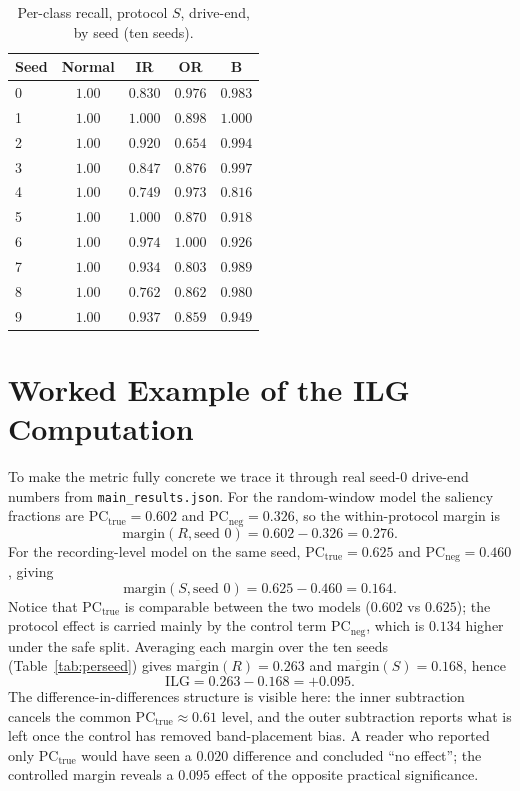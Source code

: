 \documentclass[11pt]{article}
\begin{document}
\begin{table}[H]
\centering
\caption{Per-class recall, protocol $S$, drive-end, by seed (ten seeds).}
\label{tab:perclass}
\begin{tabular}{lcccc}
\toprule
Seed & Normal & IR & OR & B \\
\midrule
0 & $1.00$ & $0.830$ & $0.976$ & $0.983$ \\
1 & $1.00$ & $1.000$ & $0.898$ & $1.000$ \\
2 & $1.00$ & $0.920$ & $0.654$ & $0.994$ \\
3 & $1.00$ & $0.847$ & $0.876$ & $0.997$ \\
4 & $1.00$ & $0.749$ & $0.973$ & $0.816$ \\
5 & $1.00$ & $1.000$ & $0.870$ & $0.918$ \\
6 & $1.00$ & $0.974$ & $1.000$ & $0.926$ \\
7 & $1.00$ & $0.934$ & $0.803$ & $0.989$ \\
8 & $1.00$ & $0.762$ & $0.862$ & $0.980$ \\
9 & $1.00$ & $0.937$ & $0.859$ & $0.949$ \\
\bottomrule
\end{tabular}
\end{table}

\section{Worked Example of the ILG Computation}
\label{app:worked}
To make the metric fully concrete we trace it through real seed-0 drive-end numbers from
\texttt{main\_results.json}. For the random-window model the saliency fractions are
$\mathrm{PC_{true}}=0.602$ and $\mathrm{PC_{neg}}=0.326$, so the within-protocol margin is
\begin{equation}
\text{margin}(R, \text{seed }0) = 0.602 - 0.326 = 0.276 .
\end{equation}
For the recording-level model on the same seed, $\mathrm{PC_{true}}=0.625$ and
$\mathrm{PC_{neg}}=0.460$, giving
\begin{equation}
\text{margin}(S, \text{seed }0) = 0.625 - 0.460 = 0.164 .
\end{equation}
Notice that $\mathrm{PC_{true}}$ is comparable between the two models
($0.602$ vs $0.625$); the protocol effect is carried mainly by the control term
$\mathrm{PC_{neg}}$, which is $0.134$ higher under the safe split. Averaging each margin
over the ten seeds (Table~\ref{tab:perseed}) gives $\overline{\text{margin}}(R)=0.263$
and $\overline{\text{margin}}(S)=0.168$, hence
\begin{equation}
\mathrm{ILG} = 0.263 - 0.168 = +0.095 .
\end{equation}
The difference-in-differences structure is visible here: the inner subtraction cancels the
common $\mathrm{PC_{true}}\approx0.61$ level, and the outer subtraction reports what is left
once the control has removed band-placement bias. A reader who reported only
$\mathrm{PC_{true}}$ would have seen a $0.020$ difference and concluded ``no effect''; the
controlled margin reveals a $0.095$ effect of the opposite practical significance.
\end{document}

